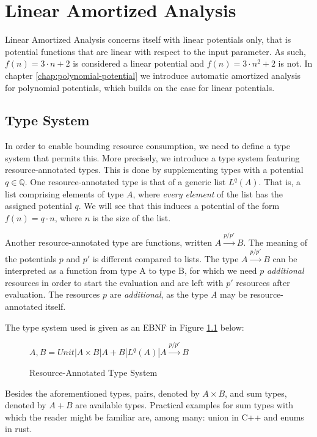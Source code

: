 \chapter{Linear Amortized Analysis} \label{chap:linear}

Linear Amortized Analysis concerns itself with linear potentials only, that is potential functions that are linear with respect to the input parameter. As such, \(f(n) = 3 \cdot n + 2\) is considered a linear potential and \(f(n) = 3 \cdot n^{2} + 2\) is not. 
In chapter \ref{chap:polynomial-potential} we introduce automatic amortized analysis for polynomial potentials, which builds on the case for linear potentials.

\section{Type System} \label{chap:type-system}
In order to enable bounding resource consumption, we need to define a type system that permits this. More precisely, we introduce a type system featuring resource-annotated types. This is done by supplementing types with a potential \(q \in \mathbb{Q}\). 
One resource-annotated type is that of a generic list \(L^q(A)\). That is, a list comprising elements of type \(A\), where \emph{every element} of the list has the assigned potential \(q\).
We will see that this induces a potential of the form \(f(n) = q \cdot n\), where \(n\) is the size of the list. 

Another resource-annotated type are functions, written \(A \xrightarrow{p/p'} B\). The meaning of the potentials \(p\) and \(p'\) is different compared to lists. The type \(A \xrightarrow{p/p'} B\) can be interpreted as a function from type A to type B, for which we need \(p\) \emph{additional} resources in order to start the evaluation and are left with \(p'\) resources after evaluation. The resources \(p\) are \emph{additional}, as the type \emph{A} may be resource-annotated itself.

The type system used is given as an EBNF in Figure \ref{fig:type-system} below:

\begin{figure}[H]
\centering
\(A,B = Unit | A \times B | A + B | L^q(A) | A \xrightarrow{p/p'} B\)
\caption{Resource-Annotated Type System}
\label{fig:type-system}
\end{figure}

Besides the aforementioned types, pairs, denoted by \(A \times B\), and sum types, denoted by \(A + B\) are available types. Practical examples for sum types with which the reader might be familiar are, among many: union in C++ and enums in rust. 

